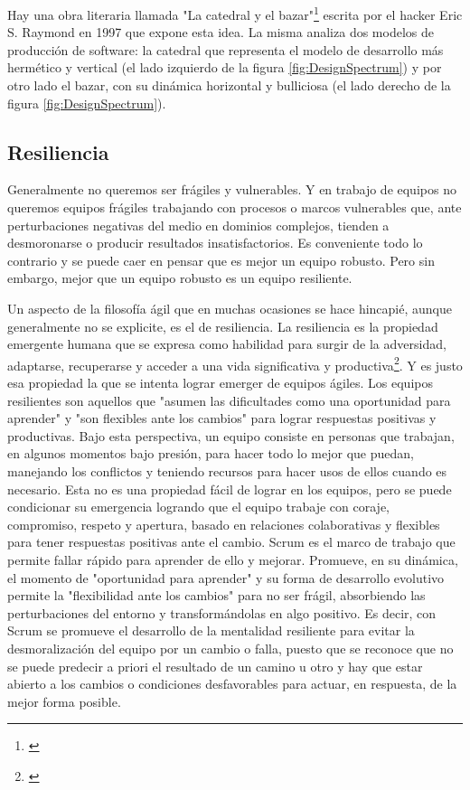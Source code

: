 Hay una obra literaria llamada "La catedral y el bazar"\footnote{\cite{Eric-Raymond-1997}} escrita por el hacker Eric S. Raymond en 1997 que expone esta idea. La misma analiza dos modelos de producción de software: la catedral que representa el modelo de desarrollo más hermético y vertical (el lado izquierdo de la figura \ref{fig:DesignSpectrum}) y por otro lado el bazar, con su dinámica horizontal y bulliciosa (el lado derecho de la figura \ref{fig:DesignSpectrum}).

\subsection{Resiliencia}

Generalmente no queremos ser frágiles y vulnerables. Y en trabajo de equipos no queremos equipos frágiles trabajando con procesos o marcos vulnerables que, ante perturbaciones negativas del medio en dominios complejos, tienden a desmoronarse o producir resultados insatisfactorios. Es conveniente todo lo contrario y se puede caer en pensar que es mejor un equipo robusto. Pero sin embargo, mejor que un equipo robusto es un equipo resiliente. 

Un aspecto de la filosofía ágil que en muchas ocasiones se hace hincapié, aunque generalmente no se explicite, es el de resiliencia. La resiliencia es la propiedad emergente humana que se expresa como habilidad para surgir de la adversidad, adaptarse, recuperarse y acceder a una vida significativa y productiva\footnote{\cite{OPS-OMS-1998}}. Y es justo esa propiedad la que se intenta lograr emerger de equipos ágiles. Los equipos resilientes son aquellos que "asumen las dificultades como una oportunidad para aprender" y "son flexibles ante los cambios" para lograr respuestas positivas y productivas. Bajo esta perspectiva, un equipo consiste en personas que trabajan, en algunos momentos bajo presión, para hacer todo lo mejor que puedan, manejando los conflictos y teniendo recursos para hacer usos de ellos cuando es necesario. Esta no es una propiedad fácil de lograr en los equipos, pero se puede condicionar su emergencia logrando que el equipo trabaje con coraje, compromiso, respeto y apertura, basado en relaciones colaborativas y flexibles para tener respuestas positivas ante el cambio. Scrum es el marco de trabajo que permite fallar rápido para aprender de ello y mejorar. Promueve, en su dinámica, el momento de "oportunidad para aprender" y su forma de desarrollo evolutivo permite la "flexibilidad ante los cambios" para no ser frágil, absorbiendo las perturbaciones del entorno y transformándolas en algo positivo. Es decir, con Scrum se promueve el desarrollo de la mentalidad resiliente para evitar la desmoralización del equipo por un cambio o falla, puesto que se reconoce que no se puede predecir a priori el resultado de un camino u otro y hay que estar abierto a los cambios o condiciones desfavorables para actuar, en respuesta, de la mejor forma posible.

